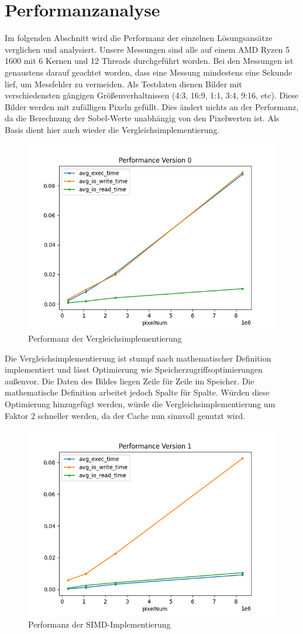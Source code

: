 \documentclass[course=erap]{aspdoc}
\begin{document}
\section{Performanzanalyse}
Im folgenden Abschnitt wird die Performanz der einzelnen Lösungsansätze verglichen und analysiert.
Unsere Messungen sind alle auf einem AMD Ryzen 5 1600 mit 6 Kernen und 12 Threads durchgeführt worden.
Bei den Messungen ist genaustens darauf geachtet worden, dass eine Messung mindestens eine Sekunde lief, um Messfehler zu vermeiden.
Als Testdaten dienen Bilder mit verschiedensten gängigen Größenverhaltnissen (4:3, 16:9, 1:1, 3:4, 9:16, etc).
Diese Bilder werden mit zufälligen Pixeln gefüllt. Dies ändert nichts an der Performanz, da die Berechnung der Sobel-Werte unabhängig von den Pixelwerten ist.
Als Basis dient hier auch wieder die Vergleichsimplementierung. 
\begin{figure}[H]
    \centering
    \includegraphics[width=0.5\columnwidth]{graphics/performance_vergleich.png}
    \caption{Performanz der Vergleichsimplementierung}
    \label{fig:performanz}
\end{figure}
Die Vergleichsimplementierung ist stumpf nach mathematischer Definition implementiert und lässt Optimierung wie Speicherzugriffsoptimierungen außenvor.
Die Daten des Bildes liegen Zeile für Zeile im Speicher. Die mathematische Definition arbeitet jedoch Spalte für Spalte.
Würden diese Optimierung hinzugefügt werden, würde die Vergleichsimplementierung um Faktor 2 schneller werden, da der Cache nun sinnvoll genutzt wird.
\begin{figure}[H]
    \centering
    \includegraphics[width=0.5\columnwidth]{graphics/performance_simd.png}
    \caption{Performanz der SIMD-Implementierung}
    \label{fig:performanz-simd}
\end{figure}
\end{document}
